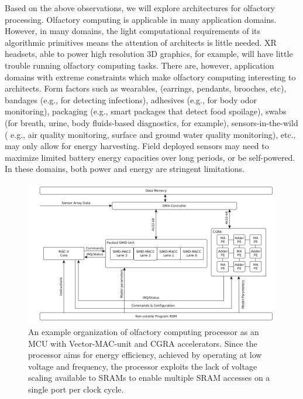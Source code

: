 Based on the above observations, we will explore architectures for olfactory processing. 
Olfactory computing is applicable in many application domains. However, in many
domains, the light computational requirements of its algorithmic primitives
means the attention of architects is little needed. XR headsets, able to power
high resolution 3D graphics, for example, will have little trouble running
olfactory computing tasks.  There are, however, application domains with
extreme constraints which make olfactory computing interesting to architects.
Form factors such as wearables, (earrings, pendants, brooches, etc), bandages
(e.g., for detecting infections), adhesives (e.g., for body odor monitoring),
packaging (e.g., smart packages that detect food spoilage), swabs (for breath,
urine, body fluids-based diagnostics, for example), sensors-in-the-wild ( e.g.,
air quality monitoring, surface and ground water quality monitoring), etc., may
only allow for energy harvesting.  Field deployed sensors may need to maximize
limited battery energy capacities over long periods, or be self-powered.  In
these domains, both power and energy are stringent limitations.

 

\begin{figure}
\centering
    \includegraphics[width=\linewidth]{arch_odor.png}
    \caption{\small
            An example organization of olfactory computing processor as an MCU with Vector-MAC-unit and CGRA
            accelerators. Since the processor aims for energy efficiency, achieved by
            operating at low voltage and frequency, the processor exploits the lack
            of voltage scaling available to SRAMs to enable multiple SRAM
            accesses on a single port per clock cycle.
        }
    \label{fig:arch}
\end{figure}

